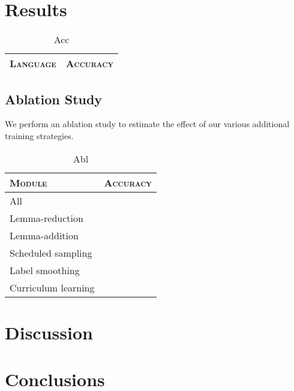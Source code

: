 \documentclass[11pt,a4paper]{article}
\begin{document}
\section{Results}

\begin{table}[h]	
\centering
\begin{tabular}{lc}
\textsc{Language} & \textsc{Accuracy} \\
  \hline
  
\end{tabular} 
\caption{Acc}
\label{tab:accuracy}
\end{table}



\subsection{Ablation Study}

We perform an ablation study to estimate the effect of our various
additional training strategies.



\begin{table}[h]	
\centering
\begin{tabular}{lc}
\textsc{Module} & \textsc{Accuracy} \\
  \hline
  All  & \\
  Lemma-reduction & \\
  Lemma-addition & \\
  Scheduled sampling & \\
  Label smoothing & \\
  Curriculum learning & \\
\end{tabular} 
\caption{Abl}
\label{tab:abl}
\end{table}

\section{Discussion}

\section{Conclusions}







\end{document}
